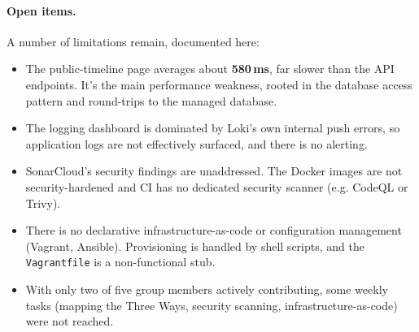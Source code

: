\paragraph{Open items.} A number of limitations remain, documented here:
\begin{itemize}
    \item The public-timeline page averages about \textbf{580\,ms}, far slower than the
        API endpoints. It's the main performance weakness, rooted in the database access
        pattern and round-trips to the managed database.
    \item The logging dashboard is dominated by Loki's own internal push errors, so
        application logs are not effectively surfaced, and there is no alerting.
    \item SonarCloud's security findings are unaddressed. The Docker images are not
        security-hardened and CI has no dedicated security scanner (e.g. CodeQL or
        Trivy).
    \item There is no declarative infrastructure-as-code or configuration management
        (Vagrant, Ansible). Provisioning is handled by shell scripts, and the
        \texttt{Vagrantfile} is a non-functional stub.
    \item With only two of five group members actively contributing, some weekly tasks
        (mapping the Three Ways, security scanning, infrastructure-as-code) were not
        reached.
\end{itemize}